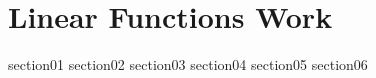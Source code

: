 \chapter{Linear Functions Work}

{section01}
{section02}
{section03}
{section04}
{section05}
{section06}